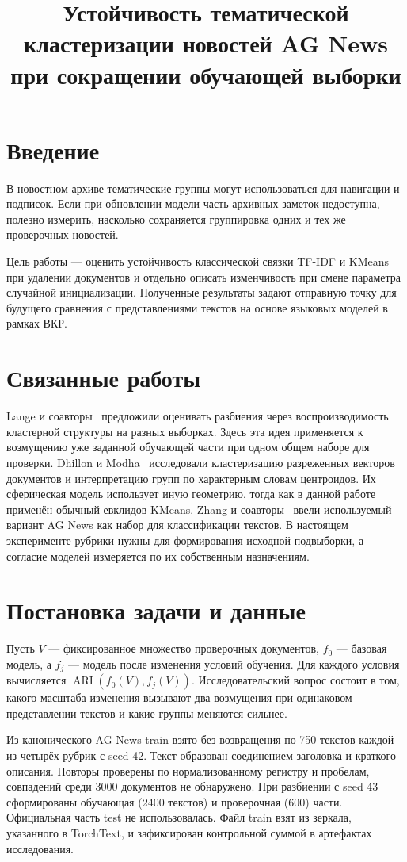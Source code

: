 \documentclass{misisarticle}
\title{Устойчивость тематической кластеризации новостей AG News при сокращении обучающей выборки}
\begin{document}
\maketitle
\section{Введение}
В новостном архиве тематические группы могут использоваться для навигации и подписок. Если при обновлении модели часть архивных заметок недоступна, полезно измерить, насколько сохраняется группировка одних и тех же проверочных новостей.

Цель работы --- оценить устойчивость классической связки TF-IDF и KMeans при удалении документов и отдельно описать изменчивость при смене параметра случайной инициализации. Полученные результаты задают отправную точку для будущего сравнения с представлениями текстов на основе языковых моделей в рамках ВКР.

\section{Связанные работы}
Lange и соавторы~\cite{lange} предложили оценивать разбиения через воспроизводимость кластерной структуры на разных выборках. Здесь эта идея применяется к возмущению уже заданной обучающей части при одном общем наборе для проверки. Dhillon и Modha~\cite{dhillon} исследовали кластеризацию разреженных векторов документов и интерпретацию групп по характерным словам центроидов. Их сферическая модель использует иную геометрию, тогда как в данной работе применён обычный евклидов KMeans. Zhang и соавторы~\cite{zhang} ввели используемый вариант AG News как набор для классификации текстов. В настоящем эксперименте рубрики нужны для формирования исходной подвыборки, а согласие моделей измеряется по их собственным назначениям.

\section{Постановка задачи и данные}
Пусть $V$ --- фиксированное множество проверочных документов, $f_0$ --- базовая модель, а $f_j$ --- модель после изменения условий обучения. Для каждого условия вычисляется $\operatorname{ARI}(f_0(V), f_j(V))$. Исследовательский вопрос состоит в том, какого масштаба изменения вызывают два возмущения при одинаковом представлении текстов и какие группы меняются сильнее.

Из канонического AG News train взято без возвращения по 750 текстов каждой из четырёх рубрик с seed 42. Текст образован соединением заголовка и краткого описания. Повторы проверены по нормализованному регистру и пробелам, совпадений среди 3000 документов не обнаружено. При разбиении с seed 43 сформированы обучающая (2400 текстов) и проверочная (600) части. Официальная часть test не использовалась. Файл train взят из зеркала, указанного в TorchText, и зафиксирован контрольной суммой в артефактах исследования.
\end{document}
